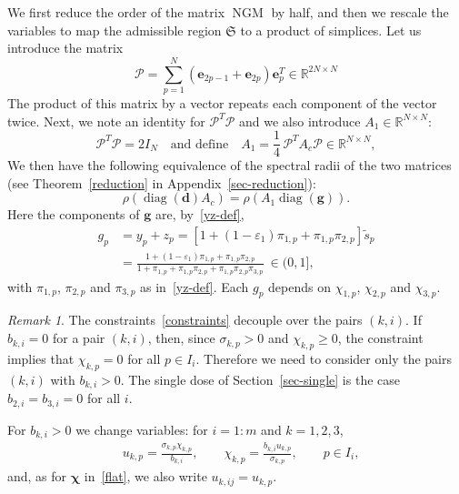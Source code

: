 \documentclass[11pt]{article}
\theoremstyle{plain}
\theoremstyle{definition}
\theoremstyle{remark}
\newtheorem{remark}[theorem]{Remark}
\numberwithin{equation}{section}
\numberwithin{figure}{section}
\numberwithin{table}{section}
\numberwithin{algorithm}{section}
\begin{document}
We first reduce the order of the matrix $\operatorname{NGM}$ by half, and then we rescale the variables to map the admissible region $\mathfrak{S}$ to a product of simplices. Let us introduce the matrix 
\begin{equation}\label{p-def}
\mathscr{P}=\sum_{p=1}^{N}\left(\bm e_{2p-1}+\bm e_{2p}\right)\bm e_p^T
\in\mathbb{R}^{2N\times N}
\end{equation}
The product of this matrix by a vector repeats each component of the vector twice. 
Next, we note an identity for $\mathscr{P}^T\mathscr{P}$  and we also 
introduce $A_1\in\mathbb{R}^{N\times N}$:
\begin{equation}\label{p-identities}
\mathscr{P}^T\mathscr{P}=2I_N \quad\mbox{and define}\quad
A_1=\frac{1}{4}\,\mathscr{P}^TA_c\mathscr{P}\in\mathbb{R}^{N\times N},
\end{equation}
We then have the following equivalence of the spectral radii of the two matrices (see Theorem~\ref{reduction} in Appendix~\ref{sec-reduction}):
\begin{equation}\label{rho-equal}
\rho\left(\operatorname{diag}(\bm d)A_c\right)=\rho\left(A_1\operatorname{diag}(\bm g)\right).
\end{equation}
Here the components of $\bm g$ are, by~\eqref{yz-def},
\begin{equation}\label{g-def}
  \begin{aligned}
g_p&=y_p+z_p
=\left\lbrack 1+(1-\varepsilon_1)\pi_{1,p}+\pi_{1,p}\pi_{2,p}\right\rbrack\widetilde s_p\\
&=\frac{1+(1-\varepsilon_1)\pi_{1,p}+\pi_{1,p}\pi_{2,p}}
{1+\pi_{1,p}+\pi_{1,p}\pi_{2,p}+\pi_{1,p}\pi_{2,p}\pi_{3,p}}\ \in(0,1],
  \end{aligned}
\end{equation}
with $\pi_{1,p}$, $\pi_{2,p}$ and $\pi_{3,p}$ as in~\eqref{yz-def}. Each $g_p$
depends on $\chi_{1,p}$, $\chi_{2,p}$ and $\chi_{3,p}$.

\begin{remark}\label{rem:b}
The constraints~\eqref{constraints} decouple over the pairs $(k,i)$. If $b_{k,i}=0$ for a pair $(k,i)$, then, since $\sigma_{k,p}>0$ and $\chi_{k,p}\ge 0$, the constraint implies that $\chi_{k,p}=0$ for all $p\in I_i$. Therefore we need to consider only the pairs $(k,i)$ with $b_{k,i}>0$. The single dose of Section~\ref{sec-single} is the case $b_{2,i}=b_{3,i}=0$ for all $i$.
\end{remark}

For $b_{k,i}>0$ we change variables: for $i=1:m$ and $k=1,2,3$,
\begin{equation}\label{u-of-chihat}
  \begin{aligned}
& u_{k,p}=\frac{\sigma_{k,p}\chi_{k,p}}{b_{k,i}},\qquad
\chi_{k,p}=\frac{b_{k,i}u_{k,p}}{\sigma_{k,p}},\qquad
p\in I_i,
  \end{aligned}
\end{equation}
and, as for $\bm\chi$ in~\eqref{flat}, we also write $u_{k,ij}=u_{k,p}$.
\end{document}
